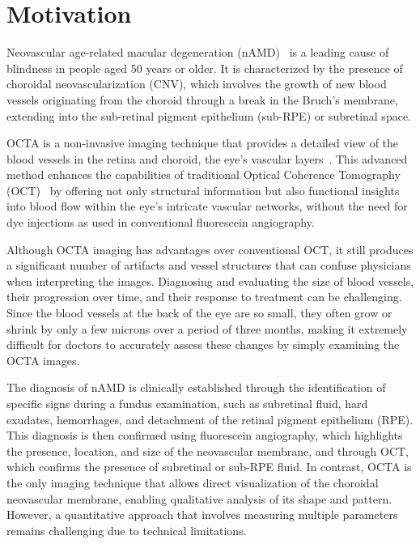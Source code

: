 \documentclass[conference]{IEEEtran}
\begin{document}

\section{Motivation}
Neovascular age-related macular degeneration (nAMD)~\cite{liu2015automated} is a leading cause of blindness in people aged 50 years or older. It is characterized by the presence of choroidal neovascularization (CNV), which involves the growth of new blood vessels originating from the choroid through a break in the Bruch's membrane, extending into the sub-retinal pigment epithelium (sub-RPE) or subretinal space.

OCTA is a non-invasive imaging technique that provides a detailed view of the blood vessels in the retina and choroid, the eye's vascular layers~\cite{de2015review}. This advanced method enhances the capabilities of traditional Optical Coherence Tomography (OCT)~\cite{diag2023} by offering not only structural information but also functional insights into blood flow within the eye's intricate vascular networks, without the need for dye injections as used in conventional fluorescein angiography.

Although OCTA imaging has advantages over conventional OCT, it still produces a significant number of artifacts and vessel structures that can confuse physicians when interpreting the images. Diagnosing and evaluating the size of blood vessels, their progression over time, and their response to treatment can be challenging. Since the blood vessels at the back of the eye are so small, they often grow or shrink by only a few microns over a period of three months, making it extremely difficult for doctors to accurately assess these changes by simply examining the OCTA images.

The diagnosis of nAMD is clinically established through the identification of specific signs during a fundus examination, such as subretinal fluid, hard exudates, hemorrhages, and detachment of the retinal pigment epithelium (RPE). This diagnosis is then confirmed using fluorescein angiography, which highlights the presence, location, and size of the neovascular membrane, and through OCT, which confirms the presence of subretinal or sub-RPE fluid. 
In contrast, OCTA is the only imaging technique that allows direct visualization of the choroidal neovascular membrane, enabling qualitative analysis of its shape and pattern. However, a quantitative approach that involves measuring multiple parameters remains challenging due to technical limitations.
 
\end{document}
